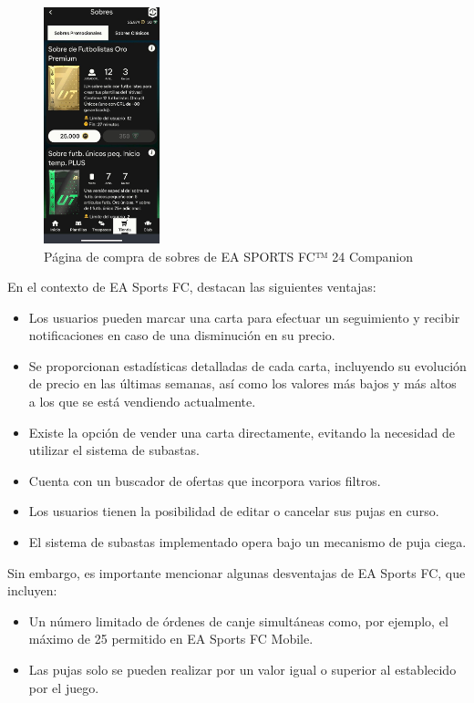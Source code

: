 \begin{figure}[H]
    \centering
    \includegraphics[width=0.3\textwidth]{figures/4-Estudio-viabilidad/4_FC_Companion2.jpeg}
    \caption{Página de compra de sobres de EA SPORTS FC™ 24 Companion}
    \label{fig:ea_sports_fc_2}
    \hypertarget{fig:ea_sports_fc_2}{}
\end{figure}

En el contexto de EA Sports FC, destacan las siguientes ventajas:
\begin{itemize}
    \item Los usuarios pueden marcar una carta para efectuar un seguimiento y recibir notificaciones en caso de una disminución en su precio.
    \item Se proporcionan estadísticas detalladas de cada carta, incluyendo su evolución de precio en las últimas semanas, así como los valores más bajos y más altos a los que se está vendiendo actualmente.
    \item Existe la opción de vender una carta directamente, evitando la necesidad de utilizar el sistema de subastas. 
    \item Cuenta con un buscador de ofertas que incorpora varios filtros.
    \item Los usuarios tienen la posibilidad de editar o cancelar sus pujas en curso.
    \item El sistema de subastas implementado opera bajo un mecanismo de puja ciega.
\end{itemize}

Sin embargo, es importante mencionar algunas desventajas de EA Sports FC, que incluyen:
\begin{itemize}
    \item Un número limitado de órdenes de canje simultáneas como, por ejemplo, el máximo de 25 permitido en EA Sports FC Mobile.
    \item Las pujas solo se pueden realizar por un valor igual o superior al establecido por el juego. 
\end{itemize}

